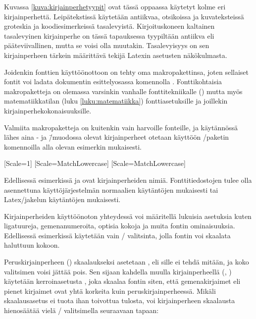 Kuvassa \ref{kuva:kirjainperhetyypit} ovat tässä oppaassa käytetyt kolme
eri kirjainperhettä. Leipätekstissä käytetään antiikvaa, otsikoissa ja
kuvateksteissä groteskia ja koodiesimerkeissä tasalevyistä.
Kirjoituskoneen kaltainen tasalevyinen kirjainperhe on tässä tapauksessa
tyypiltään antiikva eli pääteviivallinen, mutta se voisi olla muutakin.
Tasalevyisyys on sen kirjainperheen tärkein määrittävä tekijä Latexin
asetusten näkökulmasta.


Joidenkin fonttien käyttöönottoon on tehty oma makropakettinsa, joten
sellaiset fontit voi ladata dokumentin esittelyosassa komennolla
. Fonttikohtaisia makropaketteja on olemassa
varsinkin vanhalle fonttitekniikalle () mutta myös matematiikkatilan (luku \ref{luku:matematiikka})
fonttiasetuksille ja joillekin kir\-jain\-perhe\-koko\-nai\-suuk\-sille.

Valmiita makropaketteja on kuitenkin vain harvoille fonteille, ja
käytännössä lähes aina - ja 
\=/muodossa olevat kirjainperheet otetaan käyttöön
\-/paketin komennoilla alla olevan esimerkin
mukaisesti.

\begin{koodilohkosis}
\setmainfont{TeX Gyre Termes}[Scale=1]
\setsansfont{TeX Gyre Heros} [Scale=MatchLowercase]
\setmonofont{TeX Gyre Cursor}[Scale=MatchLowercase]
\end{koodilohkosis}

Edellisessä esimerkissä  ja
 ovat kirjainperheiden nimiä. Fonttitiedostojen
tulee olla asennettuna käyttöjärjestelmän normaalien käytäntöjen
mukaisesti tai Latex\-/jakelun käytäntöjen mukaisesti.

Kirjainperheiden käyttöönoton yhteydessä voi määritellä lukuisia
asetuksia kuten ligatuureja, gemenanumeroita, optisia kokoja ja muita
fontin ominaisuuksia. Edellisessä esimerkissä käytetään vain
\-/ valitsinta, jolla fontin voi skaalata haluttuun kokoon.

Peruskirjainperheen () skaalaukseksi asetetaan
, eli sille ei tehdä mitään, ja koko valitsimen voisi
jättää pois. Sen sijaan kahdella muulla kirjainperheellä
(, ) käytetään
kerroinasetusta , joka skaalaa fontin siten, että
gemenakirjaimet eli pienet kirjaimet ovat yhtä korkeita kuin
peruskirjainperheessä. Mikäli skaalausasetus  ei
tuota ihan toivottua tulosta, voi kirjainperheen skaalausta hienosäätää
vielä \-/ valitsimella seuraavaan tapaan:

